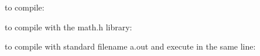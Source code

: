 to compile\+:


\begin{DoxyCode}{0}
\DoxyCodeLine{ \{\$\}}
\DoxyCodeLine{}
\DoxyCodeLine{}

\end{DoxyCode}


to compile with the math.\+h library\+:


\begin{DoxyCode}{0}
\DoxyCodeLine{ \{\$\}}
\DoxyCodeLine{}
\DoxyCodeLine{}

\end{DoxyCode}


to compile with standard filename a.\+out and execute in the same line\+:


\begin{DoxyCode}{0}
\DoxyCodeLine{ \{\$\}}
\DoxyCodeLine{}
\DoxyCodeLine{}

\end{DoxyCode}
 